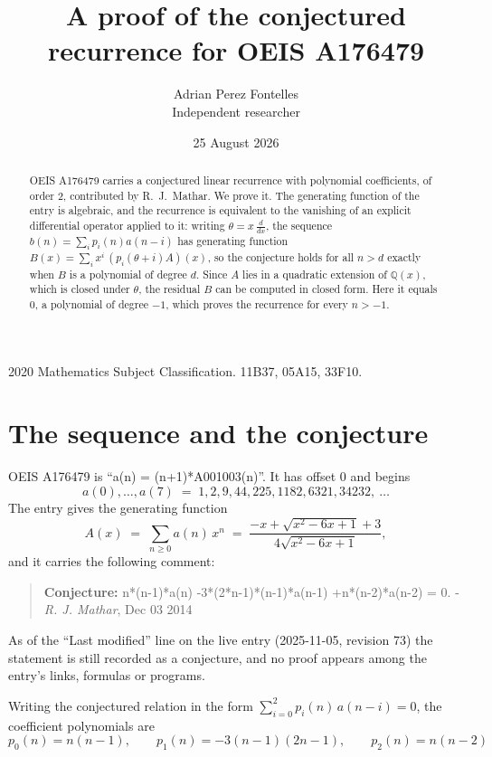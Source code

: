\documentclass[11pt,a4paper]{article}
\title{A proof of the conjectured recurrence for OEIS A176479}
\author{Adrian Perez Fontelles\\ \small Independent researcher}
\date{25 August 2026}
\theoremstyle{plain}
\theoremstyle{definition}
\begin{document}
\maketitle

\begin{abstract}
OEIS A176479 carries a conjectured linear recurrence with polynomial coefficients, of
order 2, contributed by R.~J.~Mathar. We prove it. The generating function of the
entry is algebraic, and the recurrence is equivalent to the vanishing of an explicit
differential operator applied to it: writing $\theta=x\,\frac{d}{dx}$, the sequence
$b(n)=\sum_{i}p_{i}(n)a(n-i)$ has generating function
$B(x)=\sum_{i}x^{i}\,(p_{i}(\theta+i)A)(x)$, so the conjecture holds for all $n>d$ exactly
when $B$ is a polynomial of degree $d$. Since $A$ lies in a quadratic extension of
$\mathbb{Q}(x)$, which is closed under $\theta$, the residual $B$ can be computed in
closed form. Here it equals $0$, a polynomial of degree $-1$, which proves
the recurrence for every $n>-1$.
\end{abstract}

\noindent\small 2020 Mathematics Subject Classification. 11B37, 05A15, 33F10.\normalsize

\section{The sequence and the conjecture}

OEIS A176479 is ``a(n) = (n+1)*A001003(n)''. It has offset $0$ and begins
\[
a(0),\dots,a(7)\;=\;1, 2, 9, 44, 225, 1182, 6321, 34232,\ \dots
\]
The entry gives the generating function
\begin{equation}\label{eq:gf}
A(x)\;=\;\sum_{n\ge 0} a(n)\,x^{n}\;=\;\frac{- x + \sqrt{x^{2} - 6 x + 1} + 3}{4 \sqrt{x^{2} - 6 x + 1}} ,
\end{equation}
and it carries the following comment:
\begin{quote}\small
\textbf{Conjecture:} n*(n-1)*a(n) -3*(2*n-1)*(n-1)*a(n-1) +n*(n-2)*a(n-2) = 0. - \emph{R. J. Mathar}, Dec 03 2014
\end{quote}
As of the ``Last modified'' line on the live entry (2025-11-05, revision 73) the
statement is still recorded as a conjecture, and no proof appears among the entry's links,
formulas or programs.

Writing the conjectured relation in the form $\sum_{i=0}^{2}p_{i}(n)\,a(n-i)=0$,
the coefficient polynomials are
\[
p_{0}(n)=n \left(n - 1\right),\qquad p_{1}(n)=- 3 \left(n - 1\right) \left(2 n - 1\right),\qquad p_{2}(n)=n \left(n - 2\right)
\]
\end{document}
